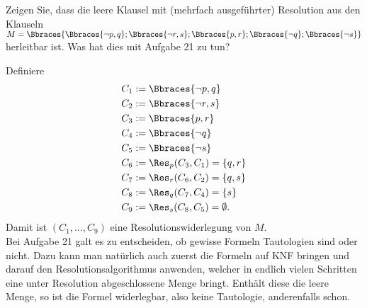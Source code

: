 
\begin{exercise}[40]

Zeigen Sie, dass die leere Klausel mit (mehrfach ausgeführter) Resolution aus den Klauseln $M = \Bbraces{\Bbraces{\neg p, q}; \Bbraces{\neg r, s}; \Bbraces{p, r}; \Bbraces{\neg q}; \Bbraces{\neg s}}$ herleitbar ist.
Was hat dies mit Aufgabe 21 zu tun?

\end{exercise}


\begin{solution}

Definiere
\begin{align*}
  C_1 &:= \Bbraces{\neg p, q} \\
  C_2 &:= \Bbraces{\neg r, s} \\
  C_3 &:= \Bbraces{p, r} \\
  C_4 &:= \Bbraces{\neg q} \\
  C_5 &:= \Bbraces{\neg s} \\
  C_6 &:= \Res_p(C_3,C_1) = \{q, r\} \\
  C_7 &:= \Res_r(C_6,C_2) = \{q, s\} \\
  C_8 &:= \Res_q(C_7,C_4) = \{s\} \\
  C_9 &:= \Res_s(C_8,C_5) = \emptyset.
\end{align*}
Damit ist $(C_1,\dots,C_9)$ eine Resolutionswiderlegung von $M$. \\
Bei Aufgabe 21 galt es zu entscheiden, ob gewisse Formeln Tautologien sind oder nicht.
Dazu kann man natürlich auch zuerst die Formeln auf KNF bringen und darauf den
Resolutionsalgorithmus anwenden, welcher in endlich vielen Schritten eine
unter Resolution abgeschlossene Menge bringt. Enthält diese die leere Menge,
so ist die Formel widerlegbar, also keine Tautologie, anderenfalls schon.

\end{solution}

